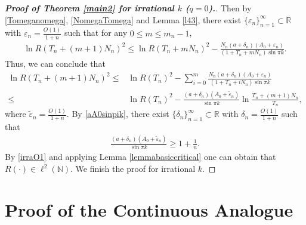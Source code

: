 \documentclass[12pt]{amsart}
\theoremstyle{plain}
\newcommand{\R}{\mathbb{R}}
\theoremstyle{definition}
\begin{document}
\begin{proof}[\textbf{Proof of Theorem \ref{main2} for irrational $k$ ($q=0$).}]
Then by \eqref{Tomeganomega}, \eqref{NomegaTomega} and Lemma \ref{l43}, there exist $\{\varepsilon_{n}\}_{n=1}^\infty
\subset\R$ with $\varepsilon_{n}=\frac{O(1)}{1+{n}}$ such that  for any $0\leq m\leq m_{n}-1$,
\begin{align}
\ln R(T_{n}+(m+1)N_{n})^2\leq \ln R(T_{n}+mN_{n})^2-\frac{N_{n}(a+\delta_{n})(A_0+\varepsilon_{n})}{(1+T_{n}+mN_{n})\sin\pi k}.\nonumber
\end{align}
Thus, we can conclude that
		\begin{align}
			\ln R(T_{n}+(m+1)N_{n})^2\leq&\ln R(T_{n})^2-\sum_{i=0}^{m}\frac{N_{n}(a+\delta_{n})(A_0+\varepsilon_{n})}{(1+T_{n}+iN_{n})\sin\pi k}\nonumber\\
			\leq &\ln R(T_{n})^2-\frac{(a+\delta_{n})(A_0+\tilde{\varepsilon}_{n})}{\sin\pi k}\ln\frac{T_{n}+(m+1)N_{n}}{T_{n}},\nonumber
		\end{align}
where $\tilde{\varepsilon}_n=\frac{O(1)}{1+n}$. By \eqref{aA0sinpik}, there exist $\{\delta_{n}\}_{n=1}^{\infty}\subset\R$ with  $\delta_n=\frac{O(1)}{1+n}$ such that 
		\begin{align}
			\frac{(a+\delta_{n})(A_0+\tilde{\varepsilon}_{n})}{\sin\pi k}\geq1+\frac{1}{n}.\nonumber
		\end{align}
	By \eqref{irraO1} and applying Lemma \ref{lemmabasiccritical} one can obtain that $R(\cdot)\in\ell^2(\mathbb{N})$. 
		We finish the proof for irrational $k$.
	\end{proof}

\appendix
\section{Proof of the Continuous Analogue}\label{appena}
\end{document}
